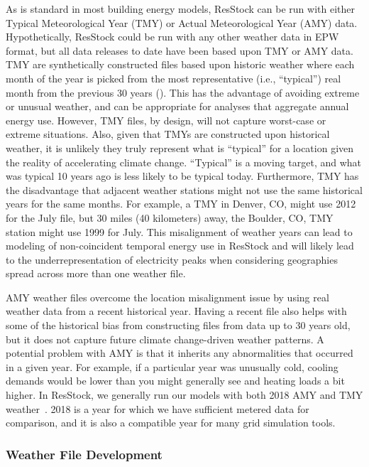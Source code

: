 As is standard in most building energy models, ResStock can be run with either Typical Meteorological Year (TMY) or Actual Meteorological Year (AMY) data. Hypothetically, ResStock could be run with any other weather data in EPW format, but all data releases to date have been based upon TMY or AMY data. TMY are synthetically constructed files based upon historic weather where each month of the year is picked from the most representative (i.e., ``typical'') real month from the previous 30 years (\cite{Wilcox2008}). This has the advantage of avoiding extreme or unusual weather, and can be appropriate for analyses that aggregate annual energy use. However, TMY files, by design, will not capture worst-case or extreme situations. Also, given that TMYs are constructed upon historical weather, it is unlikely they truly represent what is ``typical'' for a location given the reality of accelerating climate change. ``Typical'' is a moving target, and what was typical 10 years ago is less likely to be typical today. Furthermore, TMY has the disadvantage that adjacent weather stations might not use the same historical years for the same months. For example, a TMY in Denver, CO, might use 2012 for the July file, but 30 miles (40 kilometers) away, the Boulder, CO, TMY station might use 1999 for July. This misalignment of weather years can lead to modeling of non-coincident temporal energy use in ResStock and will likely lead to the underrepresentation of electricity peaks when considering geographies spread across more than one weather file.

AMY weather files overcome the location misalignment issue by using real weather data from a recent historical year. Having a recent file also helps with some of the historical bias from constructing files from data up to 30 years old, but it does not capture future climate change-driven weather patterns. A potential problem with AMY is that it inherits any abnormalities that occurred in a given year. For example, if a particular year was unusually cold, cooling demands would be lower than you might generally see and heating loads a bit higher.  In ResStock, we generally run our models with both 2018 AMY and TMY weather~\citep{Bianchi2021}. 2018 is a year for which we have sufficient metered data for comparison, and it is also a compatible year for many grid simulation tools. 

\subsubsection{Weather File Development}

